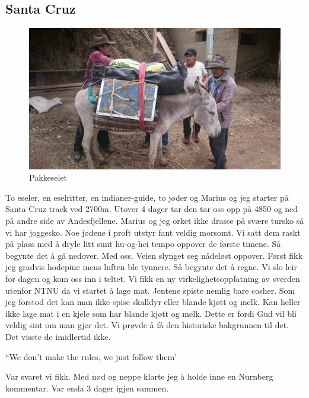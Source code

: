 \subsection*{Santa Cruz}

\begin{figure}[!h]
	\centering
	\includegraphics[width=\textwidth]{esel}
	\caption{Pakkeselet}
\label{fig:pakkesel}
\end{figure}

To eseler, en eselritter, en indianer-guide, to jøder og Marius og jeg
starter på Santa Cruz track ved 2700m. Utover 4 dager tar den tar oss opp på 4850 og
ned på andre side av Andesfjellene. Marius og jeg orket ikke drasse på
svære tursko så vi har joggesko. Noe jødene i proft utstyr fant veldig
morsomt. Vi satt dem raskt på plass med å dryle litt sunt hu-og-hei
tempo oppover de første timene. Så begynte det å gå nedover. Med oss.
Veien slynget seg nådeløst oppover. Først fikk jeg gradvis hodepine
mens luften ble tynnere. Så begynte det å regne. Vi slo leir for
dagen og kom oss inn i teltet. Vi fikk en ny virkelighetsoppfatning av
sverden utenfor NTNU da vi startet å
lage mat. Jentene spiste nemlig bare cosher. Som jeg forstod det kan
man ikke spise skalldyr eller blande kjøtt og melk. Kan heller ikke
lage mat i en kjele som har blande kjøtt og melk. Dette er fordi Gud
vil bli veldig sint om man gjør det. Vi prøvde å få den historiske
bakgrunnen til det. Det visste de imidlertid ikke. 
\begin{dialogue}
	\item ``We don't make the rules, we just follow them'
\end{dialogue}
Var svaret vi fikk. Med nød og neppe klarte jeg å
holde inne en Nurnberg kommentar. Var enda 3 dager igjen sammen.\\


